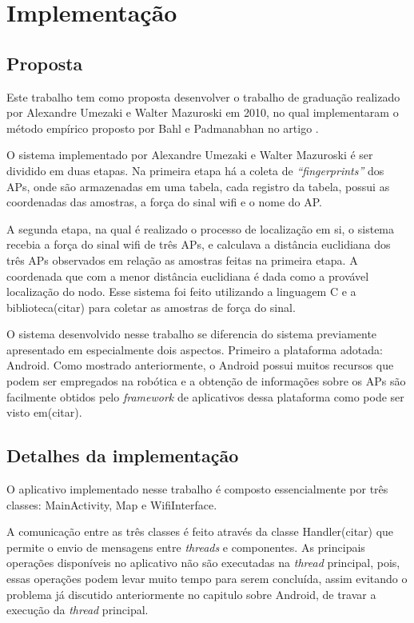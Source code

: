 \chapter{Implementação}	 
\label{implementacao}
\section{Proposta}

  Este trabalho tem como proposta desenvolver o trabalho de graduação realizado por 
  Alexandre Umezaki e Walter Mazuroski em 2010, no qual implementaram o método empírico proposto
  por Bahl e Padmanabhan no artigo \cite{wifiRadar}.
  
  O sistema implementado por Alexandre Umezaki e Walter Mazuroski é ser dividido em duas etapas. 
  Na primeira etapa há a coleta de \textit{``fingerprints''} dos APs, onde são armazenadas em
  uma tabela, cada registro da tabela,  possui as coordenadas das amostras, 
  a força do sinal wifi e o nome do AP. 
  
  A segunda etapa, na qual é realizado o processo de localização 
  em si, o sistema recebia a força do sinal wifi de três APs, e calculava a distância euclidiana dos 
  três APs observados em relação as amostras feitas na primeira etapa. A coordenada 
  que com a menor distância euclidiana é dada como a provável localização do nodo. 
  Esse sistema foi feito utilizando a linguagem C
  e a biblioteca(citar) para coletar as amostras de força do sinal.
  
  O sistema desenvolvido nesse trabalho se diferencia do sistema previamente apresentado em
  especialmente dois aspectos. Primeiro a plataforma adotada: Android. Como mostrado anteriormente,
  o Android possui muitos recursos que podem ser empregados na robótica e a obtenção de informações 
  sobre os APs são facilmente obtidos pelo \textit{framework} de aplicativos dessa plataforma como
  pode ser visto em(citar).
  
  
\section{Detalhes da implementação}

  O aplicativo implementado nesse trabalho é composto essencialmente por três  classes: MainActivity, 
  Map e WifiInterface. 
  
  A comunicação entre as três classes é feito através da classe Handler(citar) que permite o envio de 
  mensagens entre \textit{threads} e componentes. As principais operações disponíveis no aplicativo não 
  são executadas na \textit{thread} principal, pois, essas operações podem levar muito tempo para serem 
  concluída, assim evitando o problema já discutido anteriormente no capitulo sobre Android,
  de travar a execução da \textit{thread} principal.
  
